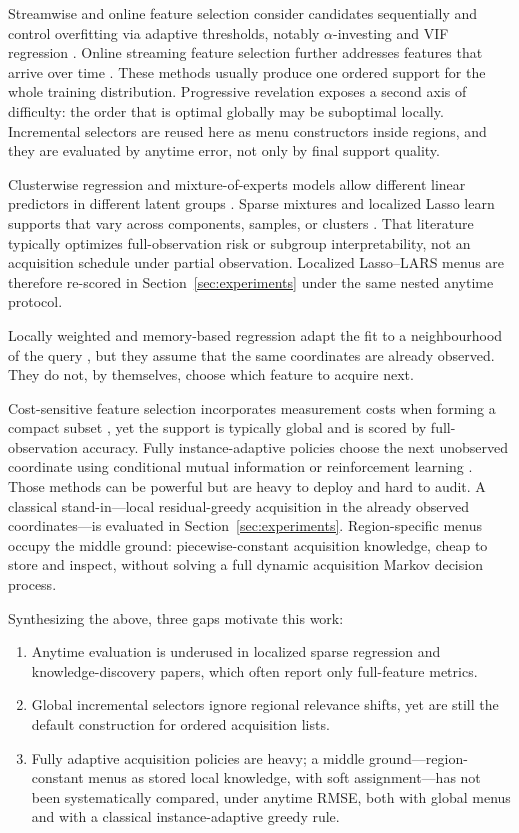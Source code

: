 \documentclass[pdflatex,sn-basic,Numbered]{sn-jnl}
\begin{document}
Streamwise and online feature selection consider candidates sequentially and control overfitting via adaptive thresholds, notably \(\alpha\)-investing and VIF regression \cite{zhou2006,foster2008,lin2011}. Online streaming feature selection further addresses features that arrive over time \cite{wu2013,zhou2017kbs}. These methods usually produce one ordered support for the whole training distribution. Progressive revelation exposes a second axis of difficulty: the order that is optimal globally may be suboptimal locally. Incremental selectors are reused here as menu constructors inside regions, and they are evaluated by anytime error, not only by final support quality.

Clusterwise regression and mixture-of-experts models allow different linear predictors in different latent groups \cite{desarbo1988,jordan1994}. Sparse mixtures and localized Lasso learn supports that vary across components, samples, or clusters \cite{chamroukhi2019,yamada2017,dimari2023,binder2012}. That literature typically optimizes full-observation risk or subgroup interpretability, not an acquisition schedule under partial observation. Localized Lasso--LARS menus are therefore re-scored in Section~\ref{sec:experiments} under the same nested anytime protocol.

Locally weighted and memory-based regression adapt the fit to a neighbourhood of the query \cite{atkeson1997,cleveland1988,birattari1998,schaal1998,vijayakumar2005}, but they assume that the same coordinates are already observed. They do not, by themselves, choose which feature to acquire next.

Cost-sensitive feature selection incorporates measurement costs when forming a compact subset \cite{zhou2016kbs}, yet the support is typically global and is scored by full-observation accuracy. Fully instance-adaptive policies choose the next unobserved coordinate using conditional mutual information or reinforcement learning \cite{ma2019,covert2023}. Those methods can be powerful but are heavy to deploy and hard to audit. A classical stand-in---local residual-greedy acquisition in the already observed coordinates---is evaluated in Section~\ref{sec:experiments}. Region-specific menus occupy the middle ground: piecewise-constant acquisition knowledge, cheap to store and inspect, without solving a full dynamic acquisition Markov decision process.

Synthesizing the above, three gaps motivate this work:
\begin{enumerate}
  \item Anytime evaluation is underused in localized sparse regression and knowledge-discovery papers, which often report only full-feature metrics.
  \item Global incremental selectors ignore regional relevance shifts, yet are still the default construction for ordered acquisition lists.
  \item Fully adaptive acquisition policies are heavy; a middle ground---region-constant menus as stored local knowledge, with soft assignment---has not been systematically compared, under anytime RMSE, both with global menus and with a classical instance-adaptive greedy rule.
\end{enumerate}
\end{document}
